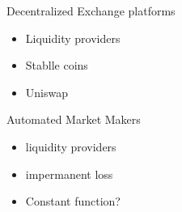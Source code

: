 \documentclass{beamer}
\begin{document}
\begin{frame}{Decentralized Exchange platforms}
\begin{itemize}
  \item Liquidity providers
  \item Stablle coins
  \item Uniswap
\end{itemize}
\end{frame}
\begin{frame}{Automated Market Makers}
\begin{itemize}
  \item liquidity providers
  \item impermanent loss
  \item Constant function? 
  \end{itemize}
\end{frame}
\end{document}
